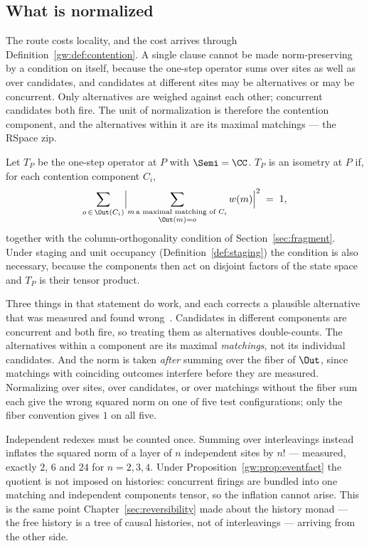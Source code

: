 \subsection{What is normalized}

The route costs locality, and the cost arrives through
Definition~\ref{gw:def:contention}.  A single clause cannot be made
norm-preserving by a condition on itself, because the one-step operator sums
over sites as well as over candidates, and candidates at different sites may
be alternatives or may be concurrent.  Only alternatives are weighed against
each other; concurrent candidates both fire.  The unit of normalization is
therefore the contention component, and the alternatives within it are its
maximal matchings --- the RSpace zip.

\begin{proposition}[Completion]
\label{prop:completion}
Let $T_P$ be the one-step operator at $P$ with $\Semi = \CC$.  $T_P$ is an
isometry at $P$ if, for each contention component $C_i$,
\[
  \sum_{o \,\in\, \Out(C_i)}
  \Bigl| \sum_{\substack{m \,\text{a maximal matching of } C_i\\ \Out(m) = o}}
          w(m) \Bigr|^{2} \;=\; 1 ,
\]
together with the column-orthogonality condition of
Section~\ref{sec:fragment}.  Under staging and unit occupancy
(Definition~\ref{def:staging}) the condition is also necessary, because the
components then act on disjoint factors of the state space and $T_P$ is their
tensor product.
\end{proposition}

Three things in that statement do work, and each corrects a plausible
alternative that was measured and found wrong~\cite{GradedQuantum}.
Candidates in different components are concurrent and both fire, so treating
them as alternatives double-counts.  The alternatives within a component are
its maximal \emph{matchings}, not its individual candidates.  And the norm is
taken \emph{after} summing over the fiber of $\Out$, since matchings with
coinciding outcomes interfere before they are measured.  Normalizing over
sites, over candidates, or over matchings without the fiber sum each give the
wrong squared norm on one of five test configurations; only the fiber
convention gives $1$ on all five.

\begin{remark}
\label{rmk:causal}
Independent redexes must be counted once.  Summing over interleavings instead
inflates the squared norm of a layer of $n$ independent sites by $n!$ ---
measured, exactly $2$, $6$ and $24$ for $n = 2,3,4$.  Under
Proposition~\ref{gw:prop:eventfact} the quotient is not imposed on
histories: concurrent firings are bundled into one matching and independent
components tensor, so the inflation cannot arise.  This is the same point
Chapter~\ref{sec:reversibility} made about the history monad --- the free
history is a tree of causal histories, not of interleavings --- arriving
from the other side.
\end{remark}

